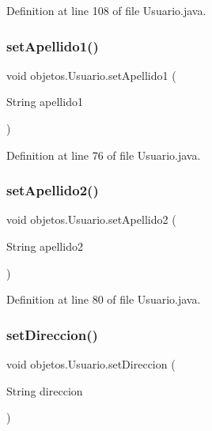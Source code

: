 Definition at line 108 of file Usuario.\+java.

\mbox{\label{classobjetos_1_1_usuario_a705188b9b04c0e4cfcad7f2973f7673e}} 
\subsubsection{\texorpdfstring{set\+Apellido1()}{setApellido1()}}
{\footnotesize\ttfamily void objetos.\+Usuario.\+set\+Apellido1 (\begin{DoxyParamCaption}\item[{String}]{apellido1 }\end{DoxyParamCaption})}



Definition at line 76 of file Usuario.\+java.

\mbox{\label{classobjetos_1_1_usuario_a73a071e063ba33c64d1453bf788b1d2f}} 
\subsubsection{\texorpdfstring{set\+Apellido2()}{setApellido2()}}
{\footnotesize\ttfamily void objetos.\+Usuario.\+set\+Apellido2 (\begin{DoxyParamCaption}\item[{String}]{apellido2 }\end{DoxyParamCaption})}



Definition at line 80 of file Usuario.\+java.

\mbox{\label{classobjetos_1_1_usuario_a617d6485d3c99725d35a7f37093a72cf}} 
\subsubsection{\texorpdfstring{set\+Direccion()}{setDireccion()}}
{\footnotesize\ttfamily void objetos.\+Usuario.\+set\+Direccion (\begin{DoxyParamCaption}\item[{String}]{direccion }\end{DoxyParamCaption})}



